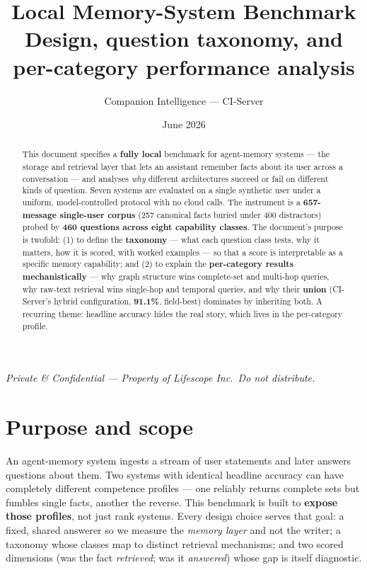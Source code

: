 \documentclass[11pt]{article}
\title{\textbf{Local Memory-System Benchmark}\\[2pt]
\large Design, question taxonomy, and per-category performance analysis}
\author{Companion Intelligence --- CI-Server}
\date{June 2026}
\begin{document}
\maketitle
\thispagestyle{empty}
\begin{center}\footnotesize\itshape Private \& Confidential --- Property of Lifescope Inc.\ Do not distribute.\end{center}

\begin{abstract}
\noindent This document specifies a \textbf{fully local} benchmark for agent-memory systems --- the storage
and retrieval layer that lets an assistant remember facts about its user across a conversation --- and analyses
\emph{why} different architectures succeed or fail on different kinds of question. Seven systems are evaluated
on a single synthetic user under a uniform, model-controlled protocol with no cloud calls. The instrument is a
\textbf{657-message single-user corpus} (257 canonical facts buried under 400 distractors) probed by
\textbf{460 questions across eight capability classes}. The document's purpose is twofold: (1) to define the
\textbf{taxonomy} --- what each question class tests, why it matters, how it is scored, with worked examples
--- so that a score is interpretable as a specific memory capability; and (2) to explain the
\textbf{per-category results mechanistically} --- why graph structure wins complete-set and multi-hop queries,
why raw-text retrieval wins single-hop and temporal queries, and why their \textbf{union} (CI-Server's hybrid
configuration, \textbf{91.1\%}, field-best) dominates by inheriting both. A recurring theme: headline accuracy
hides the real story, which lives in the per-category profile.
\end{abstract}

\section{Purpose and scope}

An agent-memory system ingests a stream of user statements and later answers questions about them. Two systems
with identical headline accuracy can have completely different competence profiles --- one reliably returns
complete sets but fumbles single facts, another the reverse. This benchmark is built to \textbf{expose those
profiles}, not just rank systems. Every design choice serves that goal: a fixed, shared answerer so we measure
the \emph{memory layer} and not the writer; a taxonomy whose classes map to distinct retrieval mechanisms; and
two scored dimensions (was the fact \emph{retrieved}; was it \emph{answered}) whose gap is itself diagnostic.
\end{document}

